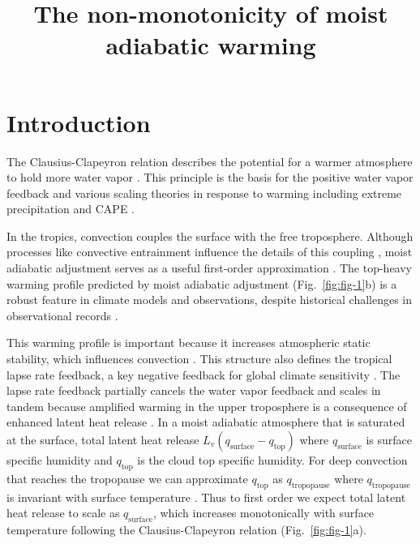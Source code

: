 \documentclass[draft]{ametsocV6.1}
\title{The non-monotonicity of moist adiabatic warming}
\affiliation{\aff{a}{Department of Geosciences, Union College, Schenectady New York, USA}}
\begin{document}
\maketitle

%
\section{Introduction}

The Clausius-Clapeyron relation describes the potential for a warmer atmosphere to hold more water vapor \citep{emanuel1994}. This principle is the basis for the positive water vapor feedback \citep{held2000a} and various scaling theories in response to warming including extreme precipitation \citep{oGorman2015} and CAPE \citep{romps2016}. 

In the tropics, convection couples the surface with the free troposphere. Although processes like convective entrainment influence the details of this coupling \citep{miyawaki2020}, moist adiabatic adjustment serves as a useful first-order approximation \citep{held1993}. The top-heavy warming profile predicted by moist adiabatic adjustment (Fig.~\ref{fig:fig-1}b) is a robust feature in climate models and observations, despite historical challenges in observational records \citep{vallis2015, santer2005}.

This warming profile is important because it increases atmospheric static stability, which influences convection \citep{neelin1987}. This structure also defines the tropical lapse rate feedback, a key negative feedback for global climate sensitivity \citep{hansen1984}. The lapse rate feedback partially cancels the water vapor feedback and scales in tandem because amplified warming in the upper troposphere is a consequence of enhanced latent heat release \citep{held2012}. In a moist adiabatic atmosphere that is saturated at the surface, total latent heat release $L_v (q_\mathrm{surface}-q_\mathrm{top})$ where $q_\mathrm{surface}$ is surface specific humidity and $q_\mathrm{top}$ is the cloud top specific humidity. For deep convection that reaches the tropopause we can approximate $q_\mathrm{top}$ as $q_\mathrm{tropopause}$ where $q_\mathrm{tropopause}$ is invariant with surface temperature \citep{seeley2019}. Thus to first order we expect total latent heat release to scale as $q_\mathrm{surface}$, which increases monotonically with surface temperature following the Clausius-Clapeyron relation (Fig.~\ref{fig:fig-1}a).
\end{document}
